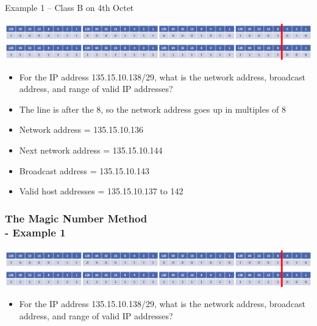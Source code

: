 \documentclass[pdflatex,compress]{beamer}
\begin{document}
\begin{frame}{Example 1 – Class B on 4th Octet}
	\begin{center}
		\includegraphics[width=\linewidth]{img/img18}
	\end{center}
	\begin{itemize}
		\item<1-> For the IP address 135.15.10.138/29, what is the network address, broadcast address, and range of valid IP addresses?
		\item<2-> The line is after the 8, so the network address goes up in multiples of 8
		\item<2-> Network address = 135.15.10.136
		\item<2-> Next network address = 135.15.10.144
		\item<2-> Broadcast address = 135.15.10.143
		\item<2-> Valid host addresses = 135.15.10.137 to 142
	\end{itemize}
\end{frame}

\begin{frame}
	\frametitle{The Magic Number Method\\ - Example 1}
	\begin{center}
		\includegraphics[width=\linewidth]{img/img18}
	\end{center}
	\begin{itemize}
		\item For the IP address 135.15.10.138/29, what is the network address, broadcast address, and range of valid IP addresses?
	\end{itemize}
\end{frame}
\end{document}
